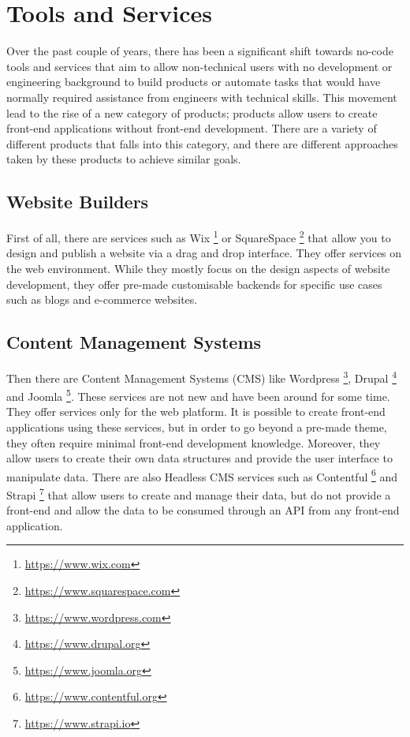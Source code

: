 \section{Tools and Services} \label{relatedTools}

Over the past couple of years, there has been a significant shift towards no-code tools and services that aim to allow non-technical users with no development or engineering background to build products or automate tasks that would have normally required assistance from engineers with technical skills. This movement lead to the rise of a new category of products; products allow users to create front-end applications without front-end development. There are a variety of different products that falls into this category, and there are different approaches taken by these products to achieve similar goals.

\subsection{Website Builders}

First of all, there are services such as Wix \footnote{\url{https://www.wix.com}} or SquareSpace \footnote{\url{https://www.squarespace.com}} that allow you to design and publish a website via a drag and drop interface. They offer services on the web environment. While they mostly focus on the design aspects of website development, they offer pre-made customisable backends for specific use cases such as blogs and e-commerce websites.

\subsection{Content Management Systems}

Then there are Content Management Systems (CMS) like Wordpress \footnote{\url{https://www.wordpress.com}}, Drupal \footnote{\url{https://www.drupal.org}} and Joomla \footnote{\url{https://www.joomla.org}}. These services are not new and have been around for some time. They offer services only for the web platform. It is possible to create front-end applications using these services, but in order to go beyond a pre-made theme, they often require minimal front-end development knowledge. Moreover, they allow users to create their own data structures and provide the user interface to manipulate data. There are also Headless CMS services such as Contentful \footnote{\url{https://www.contentful.org}} and Strapi \footnote{\url{https://www.strapi.io}} that allow users to create and manage their data, but do not provide a front-end and allow the data to be consumed through an API from any front-end application.

